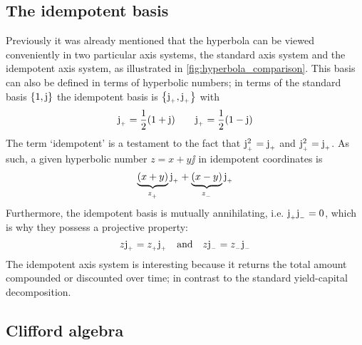 \subsection{The idempotent basis}
Previously it was already mentioned that the hyperbola can be viewed conveniently in two particular axis systems, the standard axis system and the idempotent axis system, as illustrated in \cref{fig:hyperbola_comparison}. This basis can also be defined in terms of hyperbolic numbers; in terms of the standard basis $\qty{1, \ensuremath{\mathrm{j}}}$ the idempotent basis is $\qty{\ensuremath{\mathrm{j}_{_+}}, \ensuremath{\mathrm{j}_{_+}}}$ with 
$$ \mathrm{j}_{_+} = \frac{1}{2}(1 + \mathrm{j}) \qquad \mathrm{j}_{_+} = \frac{1}{2}(1 - \mathrm{j}) $$
The term `idempotent' is a testament to the fact that $\mathrm{j}_{_+}^2 = \mathrm{j}_{_+}$ and $\mathrm{j}_{_+}^2 = \mathrm{j}_{_+}$. As such, a given hyperbolic number $z = x + y\jj$ in idempotent coordinates is 
$$ \underbrace{\qty(x + y)}_{z_{_+}}\mathrm{j}_{_+} + \underbrace{\qty(x - y)}_{z_{_-}}\mathrm{j}_{_+}$$
Furthermore, the idempotent basis is mutually annihilating, i.e. $\mathrm{j}_{_+} \mathrm{j}_{_-} = 0$, which is why they possess a projective property: \cite{Sobczyk1995}
$$ z\mathrm{j}_{_+} = z_{_+}\mathrm{j}_{_+}\quad\text{and}\quad z\mathrm{j}_{_-} = z_{_-}\mathrm{j}_{_-}$$
The idempotent axis system is interesting because it returns the total amount compounded or discounted over time; in contrast to the standard yield-capital decomposition.

\subsection{Clifford algebra}